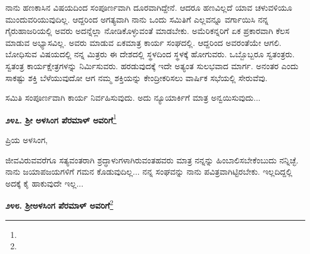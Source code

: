 ನಾನು ಹಣಕಾಸಿನ ವಿಷಯದಿಂದ ಸಂಪೂರ್ಣವಾಗಿ ದೂರವಾಗಿದ್ದೇನೆ. ಆದರೂ ಹಣವಿಲ್ಲದೆ ಯಾವ ಚಳುವಳಿಯೂ ಮುಂದುವರಿಯುವುದಿಲ್ಲ. ಆದ್ದರಿಂದ ಅಗತ್ಯವಾಗಿ ನಾನು ಒಂದು ಸಮಿತಿಗೆ ಎಲ್ಲವನ್ನೂ ವರ್ಗಾಯಿಸಿ ನನ್ನ ಗೈರುಹಾಜರಿಯಲ್ಲಿ ಅವರು ಅದನ್ನೆಲ್ಲಾ ನೋಡಿಕೊಳ್ಳುವಂತೆ ಮಾಡಬೇಕು. ಅಮೆರಿಕನ್ನರಿಗೆ ಏಕ ಪ್ರಕಾರವಾಗಿ ಕೆಲಸ ಮಾಡುವ ಅಭ್ಯಾಸವಿಲ್ಲ. ಅವರು ಮಾಡುವ ಏಕಮಾತ್ರ ಕಾರ್ಯ ಸಂಘದಲ್ಲಿ. ಆದ್ದರಿಂದ ಅವರಂತೆಯೇ ಆಗಲಿ. ಬೋಧಿಸುವ ವಿಷಯದಲ್ಲಿ ನನ್ನ ಮಿತ್ರರು ಈ ದೇಶದಲ್ಲಿ ಸ್ಥಳದಿಂದ ಸ್ಥಳಕ್ಕೆ ಹೋಗುವರು. ಒಬ್ಬೊಬ್ಬರೂ ಸ್ವತಂತ್ರರು. ಸ್ವತಂತ್ರ ಕಾರ್ಯಕ್ಷೇತ್ರಗಳನ್ನು ನಿರ್ಮಿಸುವರು. ಹರಡುವುದಕ್ಕೆ ಇದೇ ಅತ್ಯಂತ ಸುಲಭವಾದ ಮಾರ್ಗ. ಅನಂತರ ಎಂದು ಸಾಕಷ್ಟು ಶಕ್ತಿ ಬೆಳೆಯುವುದೋ ಆಗ ನಮ್ಮ ಶಕ್ತಿಯನ್ನು ಕೇಂದ್ರೀಕರಿಸಲು ವಾರ್ಷಿಕ ಸಭೆಯಲ್ಲಿ ಸೇರುವೆವು.

ಸಮಿತಿ ಸಂಪೂರ್ಣವಾಗಿ ಕಾರ್ಯ ನಿರ್ವಹಿಸುವುದು. ಅದು ನ್ಯೂಯಾರ್ಕಿಗೆ ಮಾತ್ರ ಅನ್ವಯಿಸುವುದು...

\vspace{-0.6cm}

{\flushright
{\fontsize{11.5pt}{11pt}\selectfont{ಪ್ರೀತಿ ಆಶೀರ್ವಾದಗಳೊಡನೆ ಅನವರತವೂ ನಿನ್ನ\\[-0.2pt] ವಿವೇಕಾನಂದ}}\par}

\begin{center}
\textbf{೨೪೭. ಶ‍್ರೀ ಅಳಸಿಂಗ ಪೆರಮಾಳ್ ಅವರಿಗೆ}\footnote{}
\end{center}

\vspace{-0.7cm}

\begin{flushright}
{\fontsize{11.5pt}{11pt}\selectfont{ಯು.ಎಸ್.ಎ.\\[-0.2pt] ೨೩ನೇ ಜನವರಿ, ೧೮೯೬}}
\end{flushright}

\vspace{-0.5cm}

\noindent
ಪ್ರಿಯ ಅಳಸಿಂಗ,

ಜೀವವಿರುವವರೆಗೂ ಸತ್ಯವಂತರಾಗಿ ಶ್ರದ್ಧಾಳುಗಳಾಗಿರುವಂತಹವರು ಮಾತ್ರ ನನ್ನನ್ನು ಹಿಂಬಾಲಿಸಬೇಕೆಂಬುದು ನನ್ನಿಚ್ಛೆ. ನಾನು ಜಯಾಪಜಯಗಳಿಗೆ ಗಮನ ಕೊಡುವುದಿಲ್ಲ... ನನ್ನ ಸಂಘವನ್ನು ನಾನು ಪವಿತ್ರವಾಗಿಟ್ಟಿರಬೇಕು. ಇಲ್ಲದಿದ್ದಲ್ಲಿ ಅದಕ್ಕೆ ಕೈ ಹಾಕುವುದೇ ಇಲ್ಲ...

\vspace{-0.6cm}

{\flushright
{\fontsize{11.5pt}{11pt}\selectfont{ನಿನ್ನ\\[-0.2pt] ವಿವೇಕಾನಂದ}}\par}

\begin{center}
\textbf{೨೪೮. ಶ‍್ರೀಅಳಸಿಂಗ ಪೆರಮಾಳ್ ಅವರಿಗೆ}\footnote{}
\end{center}

